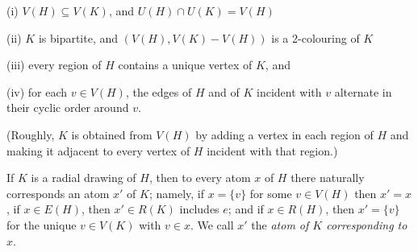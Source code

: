 \hspace*{12pt}(i) $V(H) \subseteq V(K)$, and $U(H) \cap U(K) = V(H)$

\hspace*{12pt}(ii) $K$ is bipartite, and $(V(H), V(K) - V(H))$ is a 2-colouring of $K$

\hspace*{12pt}(iii) every region of $H$ contains a unique vertex of $K$, and

\hspace*{12pt}(iv) for each $v \in V(H)$, the edges of $H$ and of $K$ incident with $v$ alternate in their cyclic order around $v$.

(Roughly, $K$ is obtained from $V(H)$ by adding a vertex in each region of $H$ and making it adjacent to every vertex of $H$ incident with that region.)

If $K$ is a radial drawing of $H$, then to every atom $x$ of $H$ there naturally corresponds an atom $x'$ of $K$; namely, if $x = \{v\}$ for some $v \in V(H)$ then $x' = x$, if $x \in E(H)$, then $x' \in R(K)$ includes $e$; and if $x \in R(H)$, then $x' = \{v\}$ for the unique $v \in V(K)$ with $v \in x$. We call $x'$ the \textit{atom of $K$ corresponding to $x$}.

